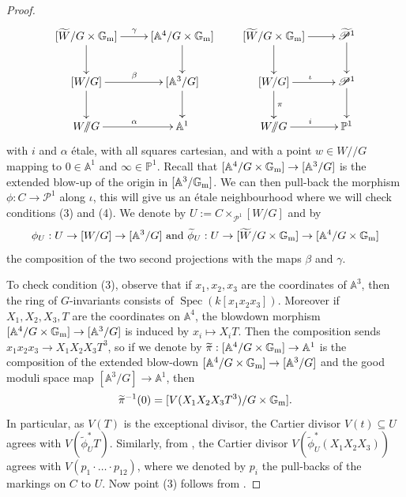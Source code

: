 \documentclass{amsart}
\newcommand{\bA}{\mathbb{A}}
\newcommand{\bG}{\mathbb{G}}
\newcommand{\bP}{\mathbb{P}}
\newcommand{\sP}{\mathscr{P}}
\newcommand{\spec}{\operatorname{Spec}}
\newcommand{\Gm}{\bG_{{\rm m}}}
\theoremstyle{definition}
\theoremstyle{definition}
\begin{document}
{\begin{proof}
\[    \xymatrix{[\widetilde{W}/G\times \Gm]\ar[d] \ar[r]^\gamma &[\bA^4/G\times \Gm]\ar[d]\\
    [W/G]\ar[d]\ar[r]^\beta  &[\bA^3/G]\ar[d]\\
    W/\!\!/G\ar[r]^\alpha& \bA^1}\text{ }\text{ }\text{ }\text{ }\text{ }\text{ }\xymatrix{[\widetilde{W}/G\times \Gm]\ar[d] \ar[r] & \widetilde{\sP}^1\ar[d]\\
    [W/G]\ar[d]^\pi\ar[r]^\iota  &\sP^1\ar[d]\\
    W/\!\!/G\ar[r]^i& \bP^1}
    \]
    with $i$ and $\alpha$ \'etale, with all squares cartesian, and with a point $w\in W/\!\!/G$ mapping to $0\in \bA^1$ and $\infty \in \bP^1$. Recall that $[\bA^4/G\times \Gm]\to [\bA^3/G]$ is the extended blow-up of the origin in $[\bA^3/\Gm]$.
    We can then pull-back the morphism $\phi:C\to \sP^1$ along $\iota$, this will give us an \'etale neighbourhood where we will check conditions (3) and (4). We denote by $U:=C\times_{\sP^1}[W/G]$ and by \[
        \phi_U:U\to [W/G]\to [\bA^3/G]\text{ and }\widetilde{\phi}_U:U\to [\widetilde{W}/G\times\Gm]\to [\bA^4/G\times \Gm]\] the composition of the two second projections with the maps $\beta$ and $\gamma$.

    To check condition (3), observe that if $x_1,x_2,x_3$ are the coordinates of $\bA^3$, then the ring of $G$-invariants consists of $\spec(k[x_1x_2x_3])$. Moreover if $X_1,X_2,X_3,T$ are the coordinates on $\bA^4$, the blowdown morphism $[\bA^4/G\times\Gm]\to [\bA^3/G]$ is induced by $x_i\mapsto X_iT$. Then the composition sends $x_1x_2x_3\to X_1X_2X_3T^3$, so if we denote by $\widetilde{\pi}:[\bA^4/G\times \Gm]\to \bA^1$ is the composition of the extended blow-down $[\bA^4/G\times \Gm]\to [\bA^3/G]$ and the good moduli space map $[\bA^3/G]\to \bA^1$, then \begin{equation}\label{equation}\widetilde{\pi}^{-1}(0)=[V(X_1X_2X_3T^3)/G\times \Gm]. \end{equation} In particular, as $V(T)$ is the exceptional divisor, the Cartier divisor $V(t)\subseteq U$ agrees with $V(\widetilde{\phi}_U^*T)$. Similarly, from , the Cartier divisor $V(\widetilde{\phi}_U^*(X_1X_2X_3))$ agrees with $V(p_1\cdot\ldots\cdot p_{12})$, where we denoted by $p_i$ the pull-backs of the markings on $C$ to $U$. Now point (3) follows from .


\end{proof}}
\end{document}
